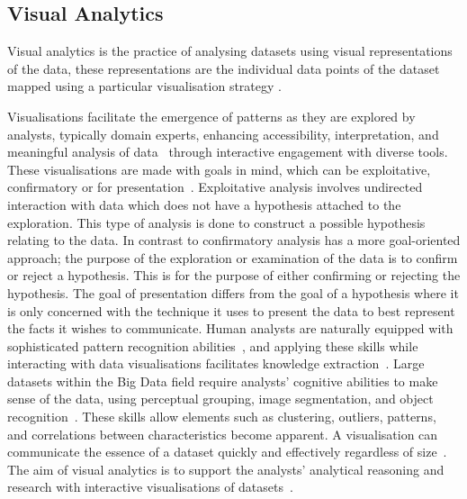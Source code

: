 \subsection{Visual Analytics}
\label{sec:visual-analytics}

Visual analytics is the practice of analysing datasets using visual representations of the data, these representations are the individual data points of the dataset mapped using a particular visualisation strategy \cite{Bikakis2018}. 

Visualisations facilitate the emergence of patterns as they are explored by analysts, typically domain experts, enhancing accessibility, interpretation, and meaningful analysis of data~\cite{Lowe2020, Tukey1977} through interactive engagement with diverse tools.
These visualisations are made with goals in mind, which can be exploitative, confirmatory or for presentation~\cite{keim1997}.
Exploitative analysis involves undirected interaction with data which does not have a hypothesis attached to the exploration.
This type of analysis is done to construct a possible hypothesis relating to the data.
In contrast to confirmatory analysis has a more goal-oriented approach; the purpose of the exploration or examination of the data is to confirm or reject a hypothesis.
This is for the purpose of either confirming or rejecting the hypothesis.
The goal of presentation differs from the goal of a hypothesis where it is only concerned with the technique it uses to present the data to best represent the facts it wishes to communicate.
Human analysts are naturally equipped with sophisticated pattern recognition abilities~\cite{Hassan2011, Taylor2015, Sneiderman1996}, and applying these skills while interacting with data visualisations facilitates knowledge extraction~\cite{Caldarola2017, Yi2007, Becker1987, Glueck2014, Bikakis2018, Muhlbacher2014, Shneiderman2008}.
Large datasets within the Big Data field require analysts' cognitive abilities to make sense of the data, using perceptual grouping, image segmentation, and object recognition~\cite{Lowe2020}.
These skills allow elements such as clustering, outliers, patterns, and correlations between characteristics become apparent.
A visualisation can communicate the essence of a dataset quickly and effectively regardless of size~\cite{Fisher2012}.
The aim of visual analytics is to support the analysts' analytical reasoning and research with interactive visualisations of datasets~\cite{Tufte1983, Ali2016, Becker1987}.

